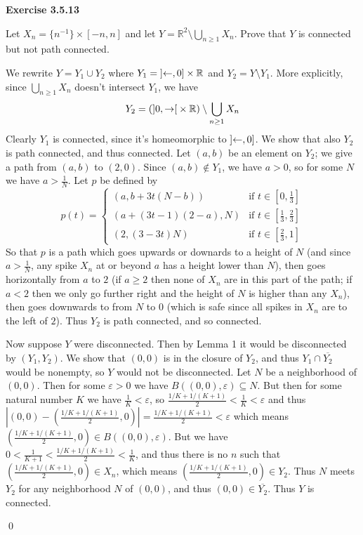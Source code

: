 \documentclass[12pt]{article}
\newcommand{\qcolor}{Gray}
\newcommand{\acolor}{Black}
\newcommand{\R}{\mathbb{R}}
\newcommand{\abs}[1]{\left|#1\right|}
\newcommand{\question}[1]{
	\color{\qcolor} 
	\item[#1~]}
\newcommand{\answer}[0]{
	\color{\acolor} 
	\item[]}
\newenvironment{exercise}[1]
{
	{
		\Large
		\color{\acolor}
		\addtolength\leftskip{-2em}
		\textbf{Exercise #1}
		
	}
	\begin{list}{}
	{
		\setlength\leftmargin{1em}
		\setlength\rightmargin{0em}
		\setlength\labelwidth{2em}
		\setlength\itemsep{0em}
		\setlength\parsep{0.5em}
		\setlength\baselineskip{1.25em}
	}
}
{
  \qed{}
  \end{list}
}
\begin{document}
\begin{exercise}{3.5.13}
  \question{} Let $X_n = \{n^{-1}\} \times [-n,n]$ and let $Y  = \R^2 \setminus \bigcup_{n\geq 1}X_n$. Prove that $Y$ is connected but not path connected.
  \answer
  We rewrite $Y = Y_1 \cup Y_2$ where $Y_1 = \interval[open left]{\leftarrow}{0} \times \R$ and $Y_2 = Y \setminus Y_1$. More explicitly, since $\bigcup_{n \geq 1} X_n$ doesn't intersect $Y_1$, we have
  $$Y_2 = (\interval[open]{0}{\rightarrow} \times \R) \setminus \bigcup_{n \geq 1} X_n$$
  Clearly $Y_1$ is connected, since it's homeomorphic to $\interval[open left]{\leftarrow}{0}$. We show that also $Y_2$ is path connected, and thus connected. Let $(a, b)$ be an element on $Y_2$; we give a path from $(a, b)$ to $(2, 0)$. Since $(a, b) \notin Y_1$, we have $a > 0$, so for some $N$ we have $a > \frac{1}{N}$. Let $p$ be defined by
  $$p(t) = 
  \begin{cases}
    (a, b + 3t(N - b)) &\text{if } t \in [0, \frac{1}{3}] \\
    (a + (3t - 1)(2 - a), N) &\text{if } t \in [\frac{1}{3},\frac{2}{3}] \\
    (2, (3 - 3t)N) &\text{if } t \in [\frac{2}{3},1]
  \end{cases}
  $$
  So that $p$ is a path which goes upwards or downards to a height of $N$ (and since $a > \frac{1}{N}$, any spike $X_n$ at or beyond $a$ has a height lower than $N$), then goes horizontally from $a$ to $2$ (if $a \geq 2$ then none of $X_n$ are in this part of the path; if $a < 2$ then we only go further right and the height of $N$ is higher than any $X_n$), then goes downwards to from $N$ to $0$ (which is safe since all spikes in $X_n$ are to the left of $2$). Thus $Y_2$ is path connected, and so connected.

  Now suppose $Y$ were disconnected. Then by Lemma 1 it would be disconnected by $(Y_1, Y_2)$. We show that $(0,0)$ is in the closure of $Y_2$, and thus $Y_1 \cap \overline{Y_2}$ would be nonempty, so $Y$ would not be disconnected. Let $N$ be a neighborhood of $(0,0)$. Then for some $\varepsilon > 0$ we have $B((0,0), \varepsilon) \subseteq N$. But then for some natural number $K$ we have $\frac{1}{K} < \varepsilon$, so $\frac{1/K + 1/(K + 1)}{2} < \frac{1}{K} < \varepsilon$ and thus $\abs{(0, 0) - \left(\frac{1/K + 1/(K + 1)}{2}, 0\right)} = \frac{1/K + 1/(K + 1)}{2} < \varepsilon$ which means $\left(\frac{1/K + 1/(K + 1)}{2}, 0\right) \in B((0, 0), \varepsilon)$. But we have $0 < \frac{1}{K+1} < \frac{1/K + 1/(K + 1)}{2} < \frac{1}{K}$, and thus there is no $n$ such that $\left(\frac{1/K + 1/(K + 1)}{2}, 0\right) \in X_n$, which means $\left(\frac{1/K + 1/(K + 1)}{2}, 0\right) \in Y_2$. Thus $N$ meets $Y_2$ for any neighborhood $N$ of $(0,0)$, and thus $(0,0) \in \overline{Y_2}$. Thus $Y$ is connected.


\end{exercise}
\end{document}
